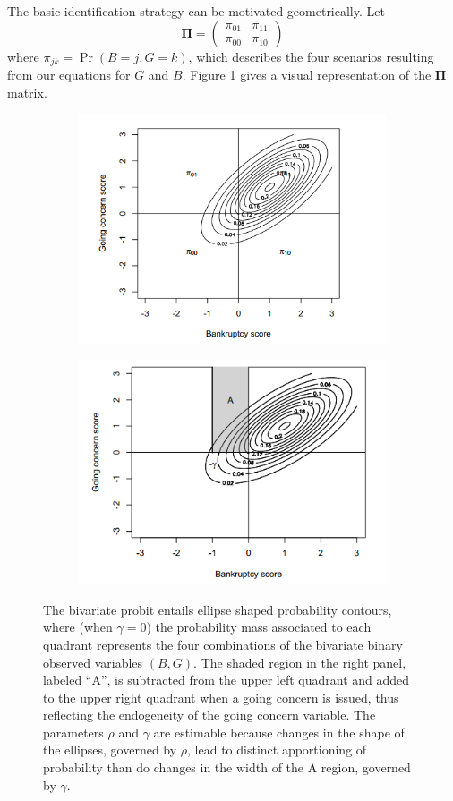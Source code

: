 \documentclass[aoas,preprint, 11pt, dvipsnames, table, x11name]{imsart}
\renewcommand{\bm}[1]{\mathbf{#1}}
\theoremstyle{remark}
\begin{document}
The basic identification strategy can be motivated geometrically. Let $$\bm{\Pi}=\begin{pmatrix}
\pi_{01}&\pi_{11}\\
\pi_{00}&\pi_{10}
\end{pmatrix}$$
where $\pi_{jk}=\Pr(B=j, G=k)$, which describes the four scenarios resulting from our equations for $G$ and $B$.  Figure \ref{ellipse} gives a visual representation of the $\bm{\Pi}$ matrix.
\begin{figure}[h]
	\centering
	\begin{subfigure}{.4\textwidth}
	\includegraphics[scale=0.44]{ellipse1}
	\end{subfigure}
	\begin{subfigure}{.4\textwidth}
\includegraphics[scale=0.5]{ellipse2}
	\end{subfigure}
\caption{The bivariate probit entails ellipse shaped probability contours, where (when $\gamma=0$) the probability mass associated to each quadrant represents the four combinations of the bivariate binary observed variables $(B, G)$. The shaded region in the right panel, labeled ``A'', is subtracted from the upper left quadrant and added to the upper right quadrant when a going concern is issued, thus reflecting the endogeneity of the going concern variable. The parameters $\rho$ and $\gamma$ are estimable because changes in the shape of the ellipses, governed by $\rho$, lead to distinct apportioning of probability than do changes in the width of the A region, governed by $\gamma$.}
\label{ellipse}
\end{figure}
\end{document}
